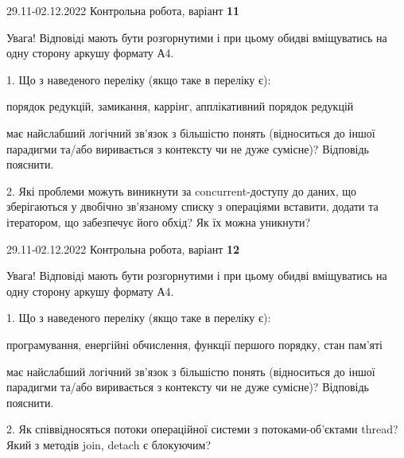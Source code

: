 \documentclass[11pt, ukrainian]{article}
\begin{document}
{29.11-02.12.2022 Контрольна робота, варіант  \No \textbf { 11 }\par}
Увага! Відповіді мають бути розгорнутими і при цьому обидві вміщуватись на одну сторону аркушу формату А4.

{
\begin {large}

1. Що з наведеного переліку (якщо таке в переліку є):

\vspace{4mm}
 порядок редукцій, замикання, каррінг, апплікативний порядок редукцій

\vspace{4mm}
має найслабший логічний зв’язок з більшістю понять (відноситься до іншої парадигми та/або виривається з контексту чи не дуже сумісне)? Відповідь пояснити.


2. Які проблеми можуть виникнути за concurrent-доступу до даних, що зберігаються у двобічно зв’язаному списку з операціями вставити, додати та ітератором, що забезпечує його обхід? Як їх можна уникнути?

\end {large}}

\vspace{4mm}



{29.11-02.12.2022 Контрольна робота, варіант  \No \textbf { 12 }\par}
Увага! Відповіді мають бути розгорнутими і при цьому обидві вміщуватись на одну сторону аркушу формату А4.

{
\begin {large}

1. Що з наведеного переліку (якщо таке в переліку є):

\vspace{4mm}
 програмування, енергійні обчислення, функції першого порядку, стан пам’яті

\vspace{4mm}
має найслабший логічний зв’язок з більшістю понять (відноситься до іншої парадигми та/або виривається з контексту чи не дуже сумісне)? Відповідь пояснити.


2. Як співвідносяться потоки операційної системи з потоками-об’єктами thread? Який з методів join, detach є блокуючим?

\end {large}}
\end{document}
